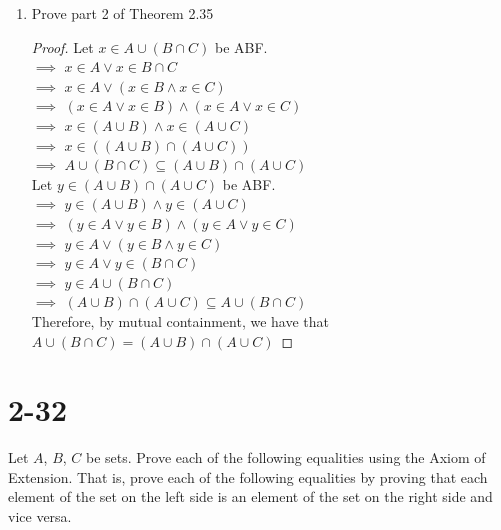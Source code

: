 \documentclass{article}
\begin{document}
\begin{enumerate}
    \item[b)] Prove part 2 of Theorem 2.35
        \begin{proof}
            Let $x \in A \cup (B \cap C)$ be ABF. \\
            $\implies$ $x \in A \lor x \in B \cap C$ \\
            $\implies$ $x \in A \lor (x \in B \land x \in C)$ \\
            $\implies$ $(x \in A \lor x \in B) \land (x \in A \lor x \in C)$ \\
            $\implies$ $x \in (A \cup B) \land x \in (A \cup C)$ \\
            $\implies$ $x \in ((A \cup B) \cap (A \cup C))$ \\
            $\implies$ $A \cup (B \cap C) \subseteq (A \cup B) \cap (A \cup C)$ \\

            Let $y \in (A \cup B) \cap (A \cup C)$ be ABF. \\
            $\implies$ $y \in (A \cup B) \land y \in (A \cup C)$ \\
            $\implies$ $(y \in A \lor y \in B) \land (y \in A \lor y \in C)$ \\
            $\implies$ $y \in A \lor (y \in B \land y \in C)$ \\
            $\implies$ $y \in A \lor y \in (B \cap C)$ \\
            $\implies$ $y \in A \cup (B \cap C)$ \\
            $\implies$ $(A \cup B) \cap (A \cup C) \subseteq A \cup (B \cap C)$ \\

            Therefore, by mutual containment, we have that $A \cup (B \cap C) =
            (A \cup B) \cap (A \cup C)$
        \end{proof}
\end{enumerate}

\section{2-32}

Let $A$, $B$, $C$ be sets.  Prove each of the following equalities using the
Axiom of Extension.  That is, prove each of the following equalities by proving
that each element of the set on the left side is an element of the set on the
right side and vice versa.
\end{document}
